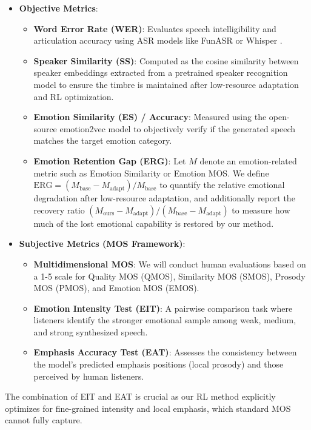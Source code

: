 \begin{itemize}
    \item \textbf{Objective Metrics}:
    \begin{itemize}
        \item \textbf{Word Error Rate (WER)}: Evaluates speech intelligibility and articulation accuracy using ASR models like FunASR \citep{2025arXiv250912508A} or Whisper \citep{Radford2022RobustSR}.
        \item \textbf{Speaker Similarity (SS)}: Computed as the cosine similarity between speaker embeddings extracted from a pretrained speaker recognition model to ensure the timbre is maintained after low-resource adaptation and RL optimization.
        \item \textbf{Emotion Similarity (ES) / Accuracy}: Measured using the open-source emotion2vec model to objectively verify if the generated speech matches the target emotion category.
        \item \textbf{Emotion Retention Gap (ERG)}: Let $M$ denote an emotion-related metric such as Emotion Similarity or Emotion MOS. We define $\mathrm{ERG} = (M_{\text{base}} - M_{\text{adapt}}) / M_{\text{base}}$ to quantify the relative emotional degradation after low-resource adaptation, and additionally report the recovery ratio $(M_{\text{ours}} - M_{\text{adapt}}) / (M_{\text{base}} - M_{\text{adapt}})$ to measure how much of the lost emotional capability is restored by our method.
    \end{itemize}
    \item \textbf{Subjective Metrics (MOS Framework)}:
    \begin{itemize}
        \item \textbf{Multidimensional MOS}: We will conduct human evaluations based on a 1-5 scale for Quality MOS (QMOS), Similarity MOS (SMOS), Prosody MOS (PMOS), and Emotion MOS (EMOS).
        \item \textbf{Emotion Intensity Test (EIT)}: A pairwise comparison task where listeners identify the stronger emotional sample among weak, medium, and strong synthesized speech. 
        \item \textbf{Emphasis Accuracy Test (EAT)}: Assesses the consistency between the model's predicted emphasis positions (local prosody) and those perceived by human listeners.
    \end{itemize}
\end{itemize}
The combination of EIT and EAT is crucial as our RL method explicitly optimizes for fine-grained intensity and local emphasis, which standard MOS cannot fully capture.

